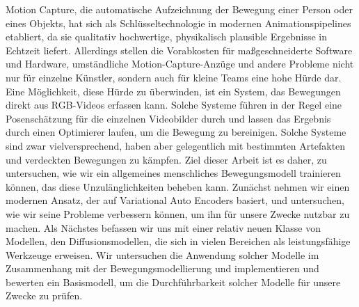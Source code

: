 Motion Capture, die automatische Aufzeichnung der Bewegung einer Person oder eines Objekts, hat sich als Schlüsseltechnologie in modernen Animationspipelines etabliert, da sie qualitativ hochwertige, physikalisch plausible Ergebnisse in Echtzeit liefert. Allerdings stellen die Vorabkosten für maßgeschneiderte Software und Hardware, umständliche Motion-Capture-Anzüge und andere Probleme nicht nur für einzelne Künstler, sondern auch für kleine Teams eine hohe Hürde dar. Eine Möglichkeit, diese Hürde zu überwinden, ist ein System, das Bewegungen direkt aus RGB-Videos erfassen kann. Solche Systeme führen in der Regel eine Posenschätzung für die einzelnen Videobilder durch und lassen das Ergebnis durch einen Optimierer laufen, um die Bewegung zu bereinigen. Solche Systeme sind zwar vielversprechend, haben aber gelegentlich mit bestimmten Artefakten und verdeckten Bewegungen zu kämpfen. Ziel dieser Arbeit ist es daher, zu untersuchen, wie wir ein allgemeines menschliches Bewegungsmodell trainieren können, das diese Unzulänglichkeiten beheben kann. Zunächst nehmen wir einen modernen Ansatz, der auf Variational Auto Encoders basiert, und untersuchen, wie wir seine Probleme verbessern können, um ihn für unsere Zwecke nutzbar zu machen. Als Nächstes befassen wir uns mit einer relativ neuen Klasse von Modellen, den Diffusionsmodellen, die sich in vielen Bereichen als leistungsfähige Werkzeuge erweisen. Wir untersuchen die Anwendung solcher Modelle im Zusammenhang mit der Bewegungsmodellierung und implementieren und bewerten ein Basismodell, um die Durchführbarkeit solcher Modelle für unsere Zwecke zu prüfen.